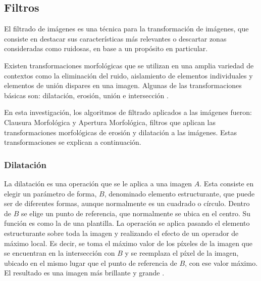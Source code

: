 \subsection{Filtros}\label{sec:filtros}
El filtrado de imágenes es una técnica para la transformación de imágenes, que consiste en destacar  sus características más relevantes o descartar zonas consideradas como ruidosas, en base a un propósito en particular. 

Existen transformaciones morfológicas que se utilizan en una amplia variedad de contextos como la eliminación del ruido, aislamiento de elementos individuales y elementos de unión dispares en una imagen. Algunas de las transformaciones básicas son: dilatación, erosión, uni\'on e intersecci\'on \cite{BookOpenCv}.

En esta investigación, los algoritmos de filtrado aplicados a las imágenes fueron: Clausura Morfológica y Apertura Morfológica, filtros que aplican las transformaciones morfológicas de erosión y dilatación a las imágenes. Estas transformaciones se explican a continuación.

 

\subsubsection{Dilatación}

La dilatación es una operación que se le aplica a una imagen $A$. Esta consiste en elegir un parámetro de forma, $B$, denominado elemento estructurante, que puede ser de diferentes formas, aunque normalmente es un cuadrado o círculo. Dentro de $B$ se elige un punto de referencia, que normalmente se ubica en el centro. Su función es como la de una plantilla. 
La operación se aplica pasando el elemento estructurante sobre toda la imagen y realizando el efecto de un operador de máximo local. Es decir, se toma el m\'aximo valor de los píxeles de la imagen que se encuentran en la intersección con $B$ y se reemplaza el píxel de la imagen, ubicado en el mismo lugar que el punto de referencia de $B$, con ese valor máximo. El resultado es una imagen más brillante  y grande \cite{BookOpenCv}. 

